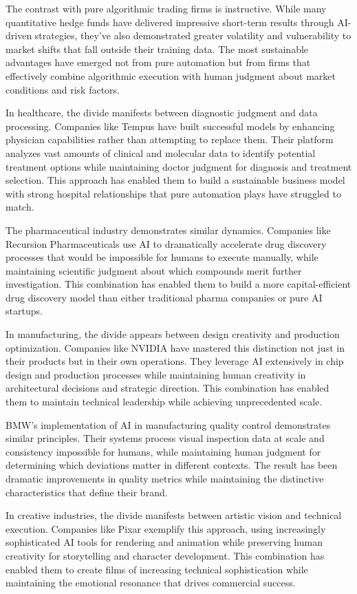 \documentclass[
  Letterpaper,
]{scrbook}
\begin{document}
The contrast with pure algorithmic trading firms is instructive. While
many quantitative hedge funds have delivered impressive short-term
results through AI-driven strategies, they've also demonstrated greater
volatility and vulnerability to market shifts that fall outside their
training data. The most sustainable advantages have emerged not from
pure automation but from firms that effectively combine algorithmic
execution with human judgment about market conditions and risk factors.

In healthcare, the divide manifests between diagnostic judgment and data
processing. Companies like Tempus have built successful models by
enhancing physician capabilities rather than attempting to replace them.
Their platform analyzes vast amounts of clinical and molecular data to
identify potential treatment options while maintaining doctor judgment
for diagnosis and treatment selection. This approach has enabled them to
build a sustainable business model with strong hospital relationships
that pure automation plays have struggled to match.

The pharmaceutical industry demonstrates similar dynamics. Companies
like Recursion Pharmaceuticals use AI to dramatically accelerate drug
discovery processes that would be impossible for humans to execute
manually, while maintaining scientific judgment about which compounds
merit further investigation. This combination has enabled them to build
a more capital-efficient drug discovery model than either traditional
pharma companies or pure AI startups.

In manufacturing, the divide appears between design creativity and
production optimization. Companies like NVIDIA have mastered this
distinction not just in their products but in their own operations. They
leverage AI extensively in chip design and production processes while
maintaining human creativity in architectural decisions and strategic
direction. This combination has enabled them to maintain technical
leadership while achieving unprecedented scale.

BMW's implementation of AI in manufacturing quality control demonstrates
similar principles. Their systems process visual inspection data at
scale and consistency impossible for humans, while maintaining human
judgment for determining which deviations matter in different contexts.
The result has been dramatic improvements in quality metrics while
maintaining the distinctive characteristics that define their brand.

In creative industries, the divide manifests between artistic vision and
technical execution. Companies like Pixar exemplify this approach, using
increasingly sophisticated AI tools for rendering and animation while
preserving human creativity for storytelling and character development.
This combination has enabled them to create films of increasing
technical sophistication while maintaining the emotional resonance that
drives commercial success.
\end{document}
